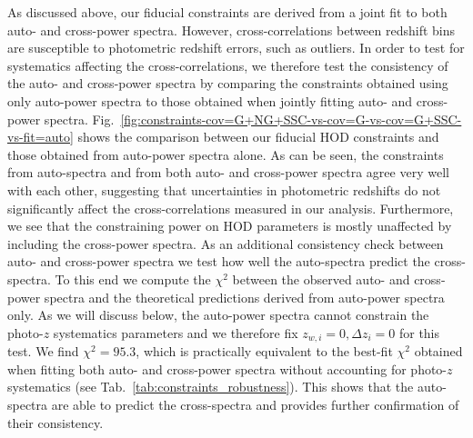\documentclass[a4paper,11pt]{article}
\begin{document}
      As discussed above, our fiducial constraints are derived from a joint fit to both auto- and cross-power spectra. However, cross-correlations between redshift bins are susceptible to photometric redshift errors, such as outliers. In order to test for systematics affecting the cross-correlations, we therefore test the consistency of the auto- and cross-power spectra by comparing the constraints obtained using only auto-power spectra to those obtained when jointly fitting auto- and cross-power spectra. Fig.~\ref{fig:constraints-cov=G+NG+SSC-vs-cov=G-vs-cov=G+SSC-vs-fit=auto} shows the comparison between our fiducial HOD constraints and those obtained from auto-power spectra alone. As can be seen, the constraints from auto-spectra and from both auto- and cross-power spectra agree very well with each other, suggesting that uncertainties in photometric redshifts do not significantly affect the cross-correlations measured in our analysis. Furthermore, we see that the constraining power on HOD parameters is mostly unaffected by including the cross-power spectra. As an additional consistency check between auto- and cross-power spectra we test how well the auto-spectra predict the cross-spectra. To this end we compute the $\chi^{2}$ between the observed auto- and cross-power spectra and the theoretical predictions derived from auto-power spectra only. As we will discuss below, the auto-power spectra cannot constrain the photo-$z$ systematics parameters and we therefore fix $z_{w, i} = 0, \Delta z_{i} = 0$ for this test. We find $\chi^{2} = 95.3$, which is practically equivalent to the best-fit $\chi^{2}$ obtained when fitting both auto- and cross-power spectra without accounting for photo-$z$ systematics (see Tab.~\ref{tab:constraints_robustness}). This shows that the auto-spectra are able to predict the cross-spectra and provides further confirmation of their consistency. 
\end{document}
